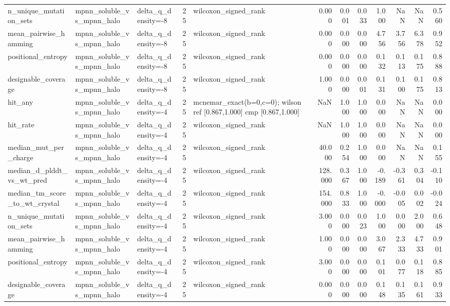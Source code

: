 \begin{table}
{\begin{tabular}{lllrlrrrrrrr}
n\_unique\_mutation\_sets & mpnn\_soluble\_vs\_mpnn\_halo & delta\_q\_density=-8 & 25 & wilcoxon\_signed\_rank & 0.000 & 0.001 & 0.033 & 1.000 & NaN & NaN & 0.560 \\
mean\_pairwise\_hamming & mpnn\_soluble\_vs\_mpnn\_halo & delta\_q\_density=-8 & 25 & wilcoxon\_signed\_rank & 0.000 & 0.000 & 0.000 & 4.756 & 3.756 & 6.378 & 0.952 \\
positional\_entropy & mpnn\_soluble\_vs\_mpnn\_halo & delta\_q\_density=-8 & 25 & wilcoxon\_signed\_rank & 0.000 & 0.000 & 0.000 & 0.132 & 0.113 & 0.175 & 0.888 \\
designable\_coverage & mpnn\_soluble\_vs\_mpnn\_halo & delta\_q\_density=-8 & 25 & wilcoxon\_signed\_rank & 1.000 & 0.000 & 0.001 & 0.131 & 0.100 & 0.175 & 0.813 \\
hit\_any & mpnn\_soluble\_vs\_mpnn\_halo & delta\_q\_density=-4 & 25 & mcnemar\_exact(b=0,c=0); wilson ref [0.867,1.000] cmp [0.867,1.000] & NaN & 1.000 & 1.000 & 0.000 & NaN & NaN & 0.000 \\
hit\_rate & mpnn\_soluble\_vs\_mpnn\_halo & delta\_q\_density=-4 & 25 & wilcoxon\_signed\_rank & NaN & 1.000 & 1.000 & 0.000 & NaN & NaN & 0.000 \\
median\_mut\_per\_charge & mpnn\_soluble\_vs\_mpnn\_halo & delta\_q\_density=-4 & 25 & wilcoxon\_signed\_rank & 40.000 & 0.254 & 1.000 & 0.000 & NaN & NaN & 0.155 \\
median\_d\_plddt\_vs\_wt\_pred & mpnn\_soluble\_vs\_mpnn\_halo & delta\_q\_density=-4 & 25 & wilcoxon\_signed\_rank & 128.000 & 0.367 & 1.000 & -0.189 & -0.361 & 0.304 & -0.110 \\
median\_tm\_score\_to\_wt\_crystal & mpnn\_soluble\_vs\_mpnn\_halo & delta\_q\_density=-4 & 25 & wilcoxon\_signed\_rank & 154.000 & 0.833 & 1.000 & -0.000 & -0.005 & 0.002 & -0.024 \\
n\_unique\_mutation\_sets & mpnn\_soluble\_vs\_mpnn\_halo & delta\_q\_density=-4 & 25 & wilcoxon\_signed\_rank & 3.000 & 0.000 & 0.023 & 1.000 & 0.000 & 2.000 & 0.648 \\
mean\_pairwise\_hamming & mpnn\_soluble\_vs\_mpnn\_halo & delta\_q\_density=-4 & 25 & wilcoxon\_signed\_rank & 1.000 & 0.000 & 0.000 & 3.067 & 2.333 & 4.733 & 0.901 \\
positional\_entropy & mpnn\_soluble\_vs\_mpnn\_halo & delta\_q\_density=-4 & 25 & wilcoxon\_signed\_rank & 3.000 & 0.000 & 0.000 & 0.101 & 0.077 & 0.118 & 0.885 \\
designable\_coverage & mpnn\_soluble\_vs\_mpnn\_halo & delta\_q\_density=-4 & 25 & wilcoxon\_signed\_rank & 0.000 & 0.000 & 0.000 & 0.148 & 0.135 & 0.161 & 0.933 \\

\end{tabular}}
\end{table}
